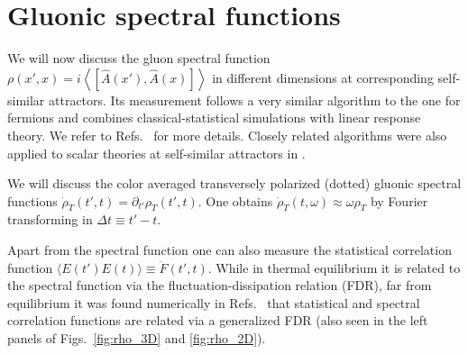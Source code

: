 \documentclass[]{webofc}
\newcommand{\figs}{Figs.~}
\newcommand{\res}{Refs.~}
\begin{document}

\section{Gluonic spectral functions}
\label{sec:gluon_rhos}


We will now discuss the gluon spectral function $\rho (x', x) = i\left\langle \left[ \hat{A}(x'), \hat{A}(x) \right] \right\rangle$ in different dimensions at corresponding self-similar attractors. Its measurement follows a very similar algorithm to the one for fermions and combines classical-statistical simulations with linear response theory. We refer to \res\cite{Boguslavski:2018beu,Kurkela:2016mhu,Boguslavski:2021buh} for more details. 
Closely related algorithms were also applied to scalar theories at self-similar attractors in \cite{PineiroOrioli:2018hst,Boguslavski:2019ecc}. 

We will discuss the color averaged transversely polarized (dotted) gluonic spectral functions $\dot\rho_T(t',t) = \partial_{t'} \rho_T(t',t)$. 
One obtains $\dot \rho_T(t,\omega)\approx \omega \rho_T$ by Fourier transforming in $\Delta t \equiv t'-t$. %

Apart from the spectral function 
one can also measure the statistical correlation function $\langle E(t') E(t) \rangle \equiv \ddot{F}(t',t)$. While in thermal equilibrium it is related to the spectral function via the fluctuation-dissipation relation (FDR), far from equilibrium it was found numerically in \res\cite{Boguslavski:2018beu,Boguslavski:2021buh} that statistical and spectral correlation functions are related via a generalized FDR (also seen in the left panels of \figs\ref{fig:rho_3D} and \ref{fig:rho_2D}).
\end{document}

